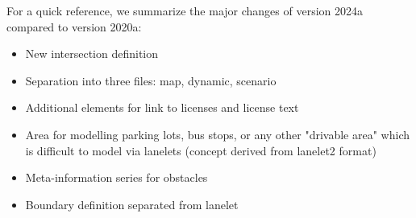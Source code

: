 For a quick reference, we summarize the major changes of version 2024a compared to version 2020a:
\begin{itemize}
\item New intersection definition
\item Separation into three files: map, dynamic, scenario
\item Additional elements for link to licenses and license text
\item Area for modelling parking lots, bus stops, or any other "drivable area" which is difficult to model via lanelets (concept derived from lanelet2 format)
\item Meta-information series for obstacles
\item Boundary definition separated from lanelet
\end{itemize}
